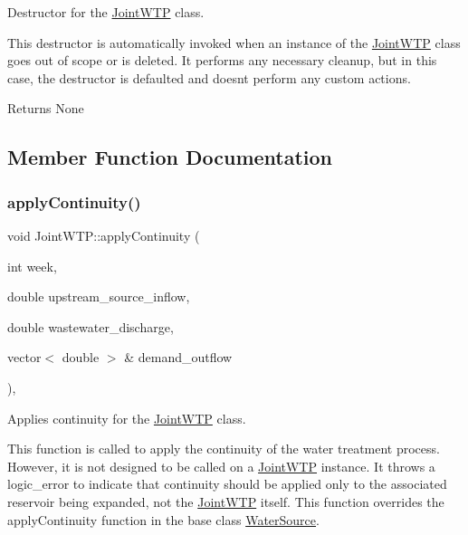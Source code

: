 Destructor for the \mbox{\hyperlink{classJointWTP}{Joint\+W\+TP}} class. 

This destructor is automatically invoked when an instance of the \mbox{\hyperlink{classJointWTP}{Joint\+W\+TP}} class goes out of scope or is deleted. It performs any necessary cleanup, but in this case, the destructor is defaulted and doesn\textquotesingle{}t perform any custom actions.

\begin{DoxyReturn}{Returns}
None 
\end{DoxyReturn}


\subsection{Member Function Documentation}
\mbox{\label{classJointWTP_a07106b573ea34386621a95d3fbcafd1a}} 
\subsubsection{\texorpdfstring{apply\+Continuity()}{applyContinuity()}}
{\footnotesize\ttfamily void Joint\+W\+T\+P\+::apply\+Continuity (\begin{DoxyParamCaption}\item[{int}]{week,  }\item[{double}]{upstream\+\_\+source\+\_\+inflow,  }\item[{double}]{wastewater\+\_\+discharge,  }\item[{vector$<$ double $>$ \&}]{demand\+\_\+outflow }\end{DoxyParamCaption})\hspace{0.3cm}{\ttfamily [override]}, {\ttfamily [virtual]}}



Applies continuity for the \mbox{\hyperlink{classJointWTP}{Joint\+W\+TP}} class. 

This function is called to apply the continuity of the water treatment process. However, it is not designed to be called on a \mbox{\hyperlink{classJointWTP}{Joint\+W\+TP}} instance. It throws a {\ttfamily logic\+\_\+error} to indicate that continuity should be applied only to the associated reservoir being expanded, not the \mbox{\hyperlink{classJointWTP}{Joint\+W\+TP}} itself. This function overrides the {\ttfamily apply\+Continuity} function in the base class {\ttfamily \mbox{\hyperlink{classWaterSource}{Water\+Source}}}.


